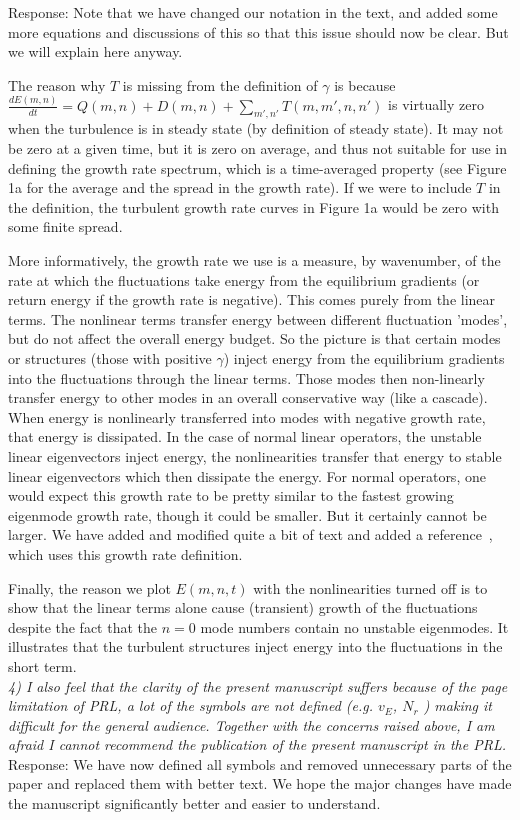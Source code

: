 \documentclass[12pt]{article}
\newcommand{\diff}[2]{\frac{d#1}{d#2}}
\begin{document}
Response: Note that we have changed our notation in the text, and added some more equations and discussions of this so that this issue should now be clear. But we will explain here anyway. 

The reason why $T$ is missing from the definition of $\gamma$ is because $\diff{E(m,n)}{t} = Q(m,n) + D(m,n) + \sum_{m',n'} T(m,m',n,n')$ is virtually zero when the turbulence is in steady state (by definition of steady state). It may not be zero at a given time, but it is zero on average, and thus not suitable for use in defining the growth rate spectrum, which is a time-averaged property (see Figure 1a for the average and the spread in the growth rate). If we were to include $T$ in the definition, the turbulent growth rate curves in Figure 1a would be zero with some finite spread.

More informatively, the growth rate we use is a measure, by wavenumber, of the rate at which the fluctuations take energy from the equilibrium gradients (or return energy if the growth rate is negative). This comes purely from the linear terms. The nonlinear terms transfer energy between different fluctuation 'modes', but do not affect the overall energy budget.
So the picture is that certain modes or structures (those with
positive $\gamma$) inject energy from the equilibrium gradients into
the fluctuations through the linear terms. Those modes then
non-linearly transfer energy to other modes in an overall conservative
way (like a cascade). When energy is nonlinearly transferred into
modes with negative growth rate, that energy is dissipated. In the
case of normal linear operators, the unstable linear eigenvectors
inject energy, the nonlinearities transfer that energy to stable
linear eigenvectors which then dissipate the energy. For normal
operators, one would expect this growth rate to be pretty similar to
the fastest growing eigenmode growth rate, though it could be
smaller. But it certainly cannot be larger. We have added and modified
quite a bit of text and added a reference~\cite{terry2006b}, which
uses this growth rate definition.

Finally, the reason we plot $E(m,n,t)$ with the nonlinearities turned off is to show that the linear terms alone cause (transient) growth of the fluctuations despite the fact that the $n=0$ mode numbers contain no unstable eigenmodes. It illustrates that the turbulent structures inject energy into the fluctuations in the short term. \\


\emph{4) I also feel that the clarity of the present manuscript suffers because of the page limitation of
PRL, a lot of the symbols are not defined (e.g. $v_E$, $N_r$ ) making it difficult for the general audience.
Together with the concerns raised above, I am afraid I cannot recommend the publication of the
present manuscript in the PRL.} \\


Response: We have now defined all symbols and removed unnecessary parts of the paper and replaced them with better text. We hope the major changes have made the manuscript significantly better and easier to understand.





%
%
\end{document}
